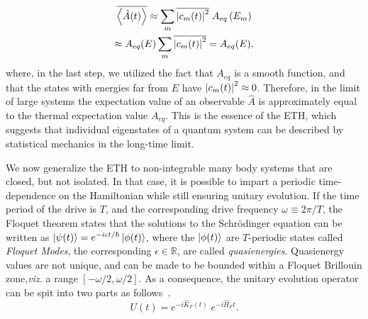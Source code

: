 \documentclass[%
reprint,
superscriptaddress,
amsmath,amssymb,
aps,
prb,
showkeys,
]{revtex4-2}
\begin{document}
\begin{multline*}
	\overline{\expval{\hat{A}(t)}} \approx \sum_m \overline{\abs{c_m(t)}^2}\; {A}_{eq}\left(E_m\right)\\
	\approx {A}_{eq}(E)\sum_m \overline{\abs{c_m(t)}^2} = A_{eq}(E),
\end{multline*}
where, in the last step, we utilized the fact that $A_{eq}$ is a smooth function, and that the states with energies far from $E$ have $\abs{c_m(t)}^2\approx 0$. Therefore, in the limit of large systems the expectation value of an observable $\hat{A}$ is approximately equal to the thermal expectation value $A_{eq}$. This is the essence of the ETH, which suggests that individual eigenstates of a quantum system can be described by statistical mechanics in the long-time limit.

We now generalize the ETH to non-integrable many body systems that are closed, but not isolated. In that case, it is possible to impart a periodic time-dependence on the Hamiltonian while still ensuring unitary evolution. If the time period of the drive is $T$, and the corresponding drive frequency $\omega\equiv 2\pi/T$, the Floquet theorem states that the solutions to the Schrödinger equation can be written as $\ket{\psi(t)} = e^{-i\epsilon t/\hbar} \ket{\phi(t)}$, where the $\ket{\phi(t)}$ are $T$-periodic states called \textit{Floquet Modes}, the corresponding $\epsilon\in \mathbb{R}$, are called \textit{quasienergies}. Quasienergy values are not unique, and can be made to be bounded within a Floquet {Brillouin zone},\textit{viz.} a range $[-\omega/2, \omega/2]$\cite{holthaus_floquet_2016,vogl_effective_2020}. As a consequence, the unitary evolution operator can be spit into two parts as follows~\cite{Bukov2014}.
\begin{equation}
	\label{eq:propagator}
	U(t) = e^{-i\hat{K}_F(t)}\;e^{-i\hat{H}_Ft}.
\end{equation}
\end{document}
